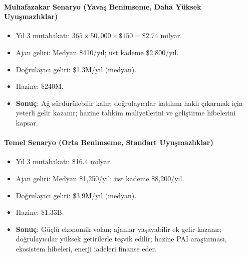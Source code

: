 \documentclass[11pt]{article}
\begin{document}
\begin{itemize}[noitemsep]
\begin{itemize}[noitemsep]
\begin{itemize}[noitemsep]
\begin{itemize}[noitemsep]
\begin{itemize}[noitemsep]
\begin{itemize}[noitemsep]
\begin{itemize}[noitemsep]
\begin{enumerate}[noitemsep]
\begin{itemize}[noitemsep]
\paragraph{Muhafazakar Senaryo (Yavaş Benimseme, Daha Yüksek Uyuşmazlıklar)}
\begin{itemize}[noitemsep]
  \item Yıl 3 mutabakatı: $365 \times 50{,}000 \times \$150 = \$2.74$ milyar.
  \item Ajan geliri: Medyan \$410/yıl; üst kademe \$2{,}800/yıl.
  \item Doğrulayıcı geliri: \$1.3M/yıl (medyan).
  \item Hazine: \$240M.
  \item \textbf{Sonuç}: Ağ sürdürülebilir kalır; doğrulayıcılar katılımı haklı çıkarmak için yeterli gelir kazanır; hazine tahkim maliyetlerini ve geliştirme hibelerini kapsar.
\end{itemize}

\paragraph{Temel Senaryo (Orta Benimseme, Standart Uyuşmazlıklar)}
\begin{itemize}[noitemsep]
  \item Yıl 3 mutabakatı: \$16.4 milyar.
  \item Ajan geliri: Medyan \$1{,}250/yıl; üst kademe \$8{,}200/yıl.
  \item Doğrulayıcı geliri: \$3.9M/yıl (medyan).
  \item Hazine: \$1.33B.
  \item \textbf{Sonuç}: Güçlü ekonomik volan; ajanlar yaşayabilir ek gelir kazanır; doğrulayıcılar yüksek getirilerle teşvik edilir; hazine PAI araştırması, ekosistem hibeleri, enerji iadeleri finanse eder.
\end{itemize}


\end{itemize}
\end{enumerate}
\end{itemize}
\end{itemize}
\end{itemize}
\end{itemize}
\end{itemize}
\end{itemize}
\end{itemize}
\end{document}
